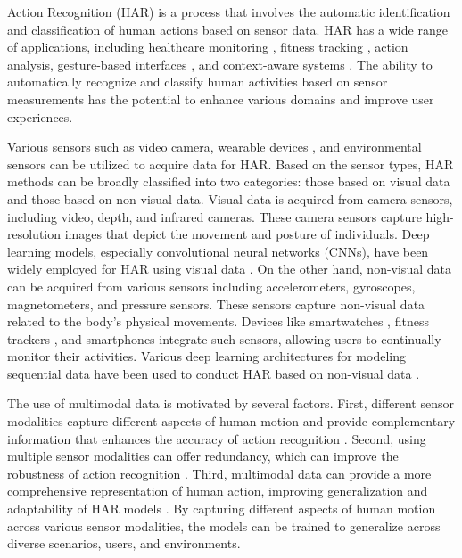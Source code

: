  Action Recognition (HAR) is a process that involves the automatic identification and classification of human actions based on sensor data. 
HAR has a wide range of applications, including healthcare monitoring \cite{liu2022overview}, fitness tracking \cite{pathan2019machine}, action analysis, gesture-based interfaces \cite{saini2020human}, and context-aware systems \cite{fan2022context}. The ability to automatically recognize and classify human activities based on sensor measurements has the potential to enhance various domains and improve user experiences. 

Various sensors such as video camera, wearable devices \cite{kumari2017increasing},  and environmental sensors \cite{cippitelli2017human} can be utilized to acquire data for HAR. 
Based on the sensor types, HAR  methods can be broadly classified into two categories: those based on visual data and those based on non-visual data. Visual data is acquired from camera sensors, including video, depth, and infrared cameras.
These camera sensors capture high-resolution images that depict the movement and posture of individuals. Deep learning models, especially convolutional neural networks (CNNs), have been widely employed for HAR using visual data \cite{taylor2010convolutional, qiu2017learning, carreira2017quo, feichtenhofer2019slowfast}.
On the other hand, non-visual data can be acquired from various sensors including accelerometers, gyroscopes, magnetometers, and pressure sensors. These sensors capture non-visual data related to the body's physical movements. Devices like smartwatches \cite{diete2019vision}, fitness trackers \cite{chen2014home}, and smartphones \cite{khandnor2017survey} integrate such sensors, allowing users to continually monitor their activities. Various deep learning architectures for modeling sequential data  have been used to conduct HAR based on non-visual data \cite{zhao2018deep,al2018hierarchical,gao2021danhar}.

The use of multimodal data is motivated by several factors. First, different sensor modalities capture different aspects of human motion and provide complementary information that enhances the accuracy of action recognition \cite{dang2020sensor}. Second, using multiple sensor modalities can offer redundancy, which can improve the robustness of action recognition \cite{ravi2016deep}. Third, multimodal data can provide a more comprehensive representation of human action, improving generalization and adaptability of HAR models \cite{ravi2016deep, atrey2010multimodal}. By capturing different aspects of human motion across various sensor modalities, the models can be trained to generalize across diverse scenarios, users, and environments.


